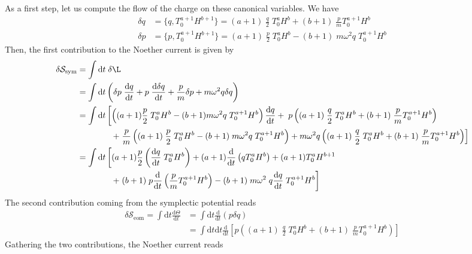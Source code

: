 \documentclass[onecolumn,notitlepage,superscriptaddress, nofootinbib,nobibnotes, aps,prd,10pt]{revtex4-1}%
\def\S{\mathcal{S}}
\def\nn{\nonumber}
\def\dd{\mathrm{d}}
\begin{document}
As a first step, let us compute the flow of the charge on these canonical variables. We have
\begin{align}
\label{qtrans}
\delta q & = \{ q, T^{a+1}_0 H^{b+1}\} = (a+1) \; \frac{q}{2} \; T^a_0 H^{b}  + (b+1) \; \frac{p}{m} T^{a+1}_0 H^b\\
\label{ptrans}
\delta p & = \{ p, T^{a+1}_0 H^{b+1}\} = (a+1) \; \frac{p}{2}\; T^a_0 H^b - (b+1) \; m \omega^2 q \; T^{a+1}_0 H^b
\end{align}
Then, the first contribution to the Noether current is given by
\begin{align}
\delta \S_{\text{sym}} & = \int \dd t \; \delta \L \\
& =    \int \dd t \left( \delta p \;  \frac{\dd q}{\dd t} + p \; \frac{\dd \delta q}{\dd t} + \frac{p}{m} \delta p + m \omega^2 q \delta q\right) \\
& = \int \dd t \left[ \left( (a+1) \frac{p}{2} \; T^a_0 H^b - (b+1) m \omega^2 q \; T^{a+1}_0 H^b \right) \frac{\dd q}{\dd t} + \; p \left( (a+1) \; \frac{q}{2} \; T^a_0 H^{b}  + (b+1) \; \frac{p}{m} T^{a+1}_0 H^b \right)  \right. \nn \\
& \left. \qquad \qquad + \; \frac{p}{m} \left( (a+1) \; \frac{p}{2}\; T^a_0 H^b - (b+1) \; m \omega^2 q \; T^{a+1}_0 H^b \right) + m \omega^2 q \left( (a+1) \; \frac{q}{2} \; T^a_0 H^{b}  + (b+1) \; \frac{p}{m} T^{a+1}_0 H^b \right)\right] \\
& = \int \dd t \left[ (a+1) \frac{p}{2} \left( \frac{\dd q}{\dd t} \; T^a_0 H^b\right) + (a+1)\frac{\dd }{\dd t} \left( q T^a_0 H^b\right) + (a+1) T^a_0 H^{b+1} \right. \\
& \qquad \qquad  \left. +\;  (b+1) \; p \frac{\dd}{\dd t} \left( \frac{p}{m} T^{a+1}_0 H^b \right) - (b+1) \; m \omega^2 \; q \frac{\dd q}{\dd t} \; T^{a+1}_0 H^b \right]
\end{align}
The second contribution coming from the symplectic potential reads
\begin{align}
\delta \S_{\text{eom}} = \int \dd t \frac{\dd \Theta}{\dd t} & = \int \dd t \frac{\dd}{\dd t} \left( p \delta q\right) \\
& = \int \dd t \dd t \frac{\dd}{\dd t} \left[  p \left( (a+1) \; \frac{q}{2} \; T^a_0 H^{b}  + (b+1) \; \frac{p}{m} T^{a+1}_0 H^b \right) \right] 
\end{align}
Gathering the two contributions, the Noether current reads
\end{document}
